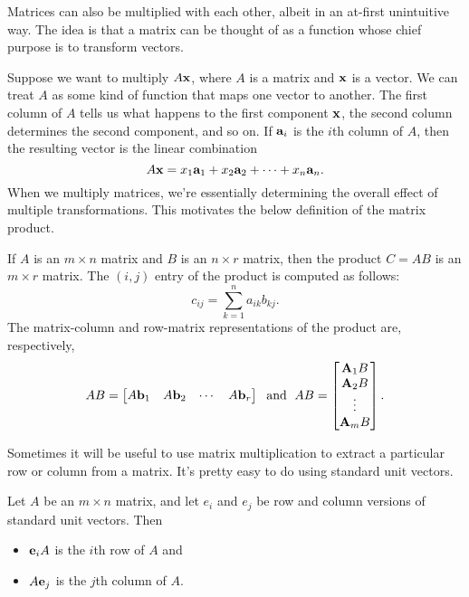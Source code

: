 \documentclass[../m73main.tex]{subfiles}
\begin{document}
Matrices can also be multiplied with each other, albeit in an at-first unintuitive way.
The idea is that a matrix can be thought of as a function whose chief purpose is to transform vectors.

Suppose we want to multiply $A \mathbf{x}$, where $A$ is a matrix and $\mathbf{x}$ is a vector.
We can treat $A$ as some kind of function that maps one vector to another.
The first column of $A$ tells us what happens to the first component $\mathbf{x}$, the second column determines the second component, and so on.
If $\mathbf{a}_i$ is the $i$th column of $A$, then the resulting vector is the linear combination
\[ A \mathbf{x} = x_1 \mathbf{a}_1 + x_2 \mathbf{a}_2 + \cdots + x_n \mathbf{a}_n. \]
When we multiply matrices, we're essentially determining the overall effect of multiple transformations.
This motivates the below definition of the matrix product.

\begin{definition}
	If $A$ is an $m\times n$ matrix and $B$ is an $n\times r$ matrix, then the product $C = AB$ is an $m\times r$ matrix.
	The $(i,j)$ entry of the product is computed as follows:
	\[ c_{ij} = \sum_{k=1}^n a_{ik} b_{kj}. \]
	The matrix-column and row-matrix representations of the product are, respectively,
	\[ AB = \begin{bmatrix} A \mathbf{b}_1 & A \mathbf{b}_2 & \cdots & A \mathbf{b}_r \end{bmatrix} \;\text{ and }\; AB = \begin{bmatrix} \mathbf{A}_1 B \\ \mathbf{A}_2 B\\ \vdots \\ \mathbf{A}_m B \end{bmatrix}. \]
\end{definition}

Sometimes it will be useful to use matrix multiplication to extract a particular row or column from a matrix.
It's pretty easy to do using standard unit vectors.

\begin{theorem}
	Let $A$ be an $m\times n$ matrix, and let $e_i$ and $e_j$ be row and column versions of standard unit vectors.
	Then
	\begin{itemize}
		\item $\mathbf{e}_iA$ is the $i$th row of $A$ and
		\item $A\mathbf{e}_j$ is the $j$th column of $A$.
	\end{itemize}
\end{theorem}
\end{document}
